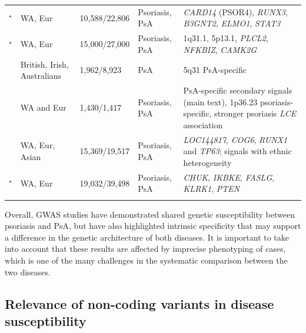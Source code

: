 \begin{landscape}
\begin{center}
\begin{longtable}[ht]{p{.25\textheight} p{.25\textheight} p{.20\textheight} p{.20\textheight} p{.50\textheight}}
\parencite{Tsoi2012}$^\star$ & WA, Eur & 10,588/22,806 & Psoriasis, PsA & \textit{CARD14} (PSOR4), \textit{RUNX3}, \textit{B3GNT2}, \textit{ELMO1}, \textit{STAT3} \\

\parencite{Tsoi2015}$^\star$	& WA, Eur	& 15,000/27,000	& Psoriasis, PsA	& 1q31.1, 5p13.1, \textit{PLCL2}, \textit{NFKBIZ}, \textit{CAMK2G} \\

\parencite{Bowes2015} &	British, Irish, Australians	& 1,962/8,923	& PsA	& 5q31 PsA-specific \\

\parencite{Stuart2015} &	WA and Eur	& 1,430/1,417	& Psoriasis, PsA	& PsA-specific secondary signals (main text), 1p36.23 psoriasis-specific, stronger psoriasis \textit{LCE} association\\

\parencite{Yin2015} &	WA, Eur, Asian	&  15,369/19,517 & Psoriasis, PsA	& \textit{LOC144817}, \textit{COG6}, \textit{RUNX1} and \textit{TP63}; signals with ethnic heterogeneity \\

\parencite{Tsoi2017}$^\star$ &	WA, Eur	& 19,032/39,498	& Psoriasis, PsA	& \textit{CHUK}, \textit{IKBKE}, \textit{FASLG}, \textit{KLRK1}, \textit{PTEN} \\																		
\bottomrule
\medskip
\end{longtable}
\end{center}
\end{landscape}


Overall, GWAS studies have demonstrated shared genetic susceptibility between psoriasis and PsA, but have also highlighted intrinsic specificity that may support a difference in the genetic architecture of both diseases. It is important to take into account that these results are affected by imprecise phenotyping of cases, which is one of the many challenges in the systematic comparison between the two diseases.

\subsection{Relevance of non-coding variants in disease susceptibility}

